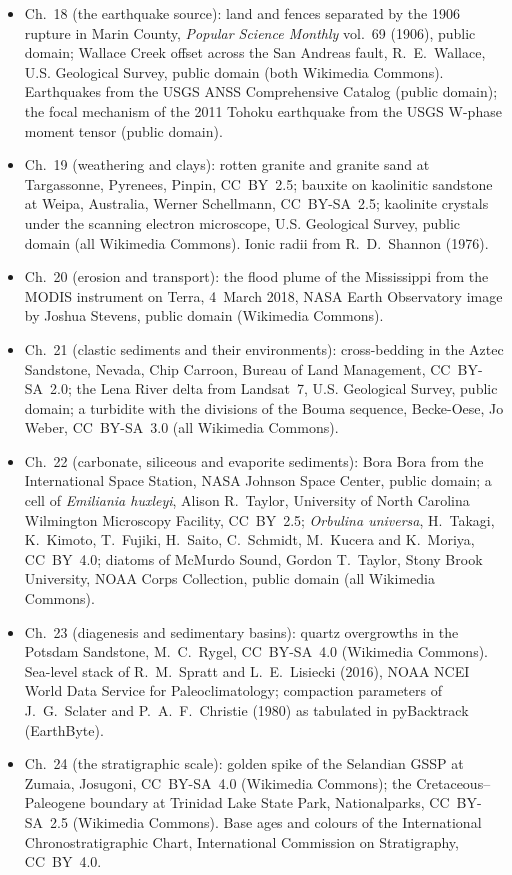 \begin{itemize}
  \item Ch.~18 (the earthquake source): land and fences separated by the 1906 rupture in Marin County, \emph{Popular Science Monthly} vol.~69 (1906), public domain; Wallace Creek offset across the San Andreas fault, R.~E.~Wallace, U.S. Geological Survey, public domain (both Wikimedia Commons). Earthquakes from the USGS ANSS Comprehensive Catalog (public domain); the focal mechanism of the 2011 Tohoku earthquake from the USGS W-phase moment tensor (public domain).
  \item Ch.~19 (weathering and clays): rotten granite and granite sand at Targassonne, Pyrenees, Pinpin, CC~BY~2.5; bauxite on kaolinitic sandstone at Weipa, Australia, Werner Schellmann, CC~BY-SA~2.5; kaolinite crystals under the scanning electron microscope, U.S. Geological Survey, public domain (all Wikimedia Commons). Ionic radii from R.~D.~Shannon (1976).
  \item Ch.~20 (erosion and transport): the flood plume of the Mississippi from the MODIS instrument on Terra, 4~March 2018, NASA Earth Observatory image by Joshua Stevens, public domain (Wikimedia Commons).
  \item Ch.~21 (clastic sediments and their environments): cross-bedding in the Aztec Sandstone, Nevada, Chip Carroon, Bureau of Land Management, CC~BY-SA~2.0; the Lena River delta from Landsat~7, U.S. Geological Survey, public domain; a turbidite with the divisions of the Bouma sequence, Becke-Oese, Jo Weber, CC~BY-SA~3.0 (all Wikimedia Commons).
  \item Ch.~22 (carbonate, siliceous and evaporite sediments): Bora Bora from the International Space Station, NASA Johnson Space Center, public domain; a cell of \emph{Emiliania huxleyi}, Alison R.~Taylor, University of North Carolina Wilmington Microscopy Facility, CC~BY~2.5; \emph{Orbulina universa}, H.~Takagi, K.~Kimoto, T.~Fujiki, H.~Saito, C.~Schmidt, M.~Kucera and K.~Moriya, CC~BY~4.0; diatoms of McMurdo Sound, Gordon T.~Taylor, Stony Brook University, NOAA Corps Collection, public domain (all Wikimedia Commons).
  \item Ch.~23 (diagenesis and sedimentary basins): quartz overgrowths in the Potsdam Sandstone, M.~C.~Rygel, CC~BY-SA~4.0 (Wikimedia Commons). Sea-level stack of R.~M.~Spratt and L.~E.~Lisiecki (2016), NOAA NCEI World Data Service for Paleoclimatology; compaction parameters of J.~G.~Sclater and P.~A.~F.~Christie (1980) as tabulated in pyBacktrack (EarthByte).
  \item Ch.~24 (the stratigraphic scale): golden spike of the Selandian GSSP at Zumaia, Josugoni, CC~BY-SA~4.0 (Wikimedia Commons); the Cretaceous--Paleogene boundary at Trinidad Lake State Park, Nationalparks, CC~BY-SA~2.5 (Wikimedia Commons). Base ages and colours of the International Chronostratigraphic Chart, International Commission on Stratigraphy, CC~BY~4.0.

\end{itemize}
